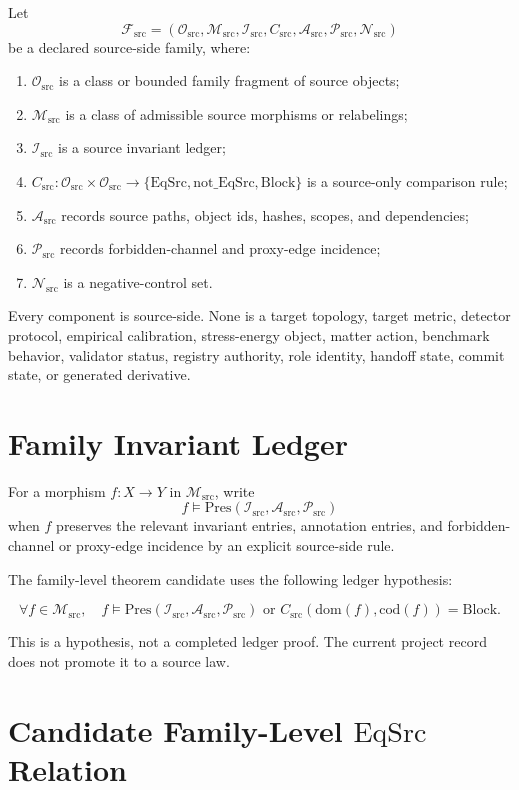 \documentclass[11pt]{article}
\newcommand{\EqSrc}{\mathrm{EqSrc}}
\newcommand{\Block}{\mathrm{Block}}
\newcommand{\NotEqSrc}{\mathrm{not\_EqSrc}}
\newcommand{\Fsrc}{\mathcal{F}_{\mathrm{src}}}
\newcommand{\Osrc}{\mathcal{O}_{\mathrm{src}}}
\newcommand{\Msrc}{\mathcal{M}_{\mathrm{src}}}
\newcommand{\Isrc}{\mathcal{I}_{\mathrm{src}}}
\newcommand{\Asrc}{\mathcal{A}_{\mathrm{src}}}
\newcommand{\Psrc}{\mathcal{P}_{\mathrm{src}}}
\newcommand{\Nsrc}{\mathcal{N}_{\mathrm{src}}}
\newcommand{\Csrc}{C_{\mathrm{src}}}
\begin{document}
Let
\[
  \Fsrc=(\Osrc,\Msrc,\Isrc,\Csrc,\Asrc,\Psrc,\Nsrc)
\]
be a declared source-side family, where:
\begin{enumerate}[label=(\alph*)]
  \item \(\Osrc\) is a class or bounded family fragment of source objects;
  \item \(\Msrc\) is a class of admissible source morphisms or relabelings;
  \item \(\Isrc\) is a source invariant ledger;
  \item \(\Csrc:\Osrc\times\Osrc\to\{\EqSrc,\NotEqSrc,\Block\}\) is a
  source-only comparison rule;
  \item \(\Asrc\) records source paths, object ids, hashes, scopes, and
  dependencies;
  \item \(\Psrc\) records forbidden-channel and proxy-edge incidence;
  \item \(\Nsrc\) is a negative-control set.
\end{enumerate}

Every component is source-side. None is a target topology, target metric,
detector protocol, empirical calibration, stress-energy object, matter action,
benchmark behavior, validator status, registry authority, role identity,
handoff state, commit state, or generated derivative.

\section{Family Invariant Ledger}

For a morphism \(f:X\to Y\) in \(\Msrc\), write
\[
  f \models \mathrm{Pres}(\Isrc,\Asrc,\Psrc)
\]
when \(f\) preserves the relevant invariant entries, annotation entries, and
forbidden-channel or proxy-edge incidence by an explicit source-side rule.

The family-level theorem candidate uses the following ledger hypothesis:

\[
  \forall f\in\Msrc,\quad
  f \models \mathrm{Pres}(\Isrc,\Asrc,\Psrc)
  \text{ or } \Csrc(\mathrm{dom}(f),\mathrm{cod}(f))=\Block.
\]

This is a hypothesis, not a completed ledger proof. The current project record
does not promote it to a source law.

\section{Candidate Family-Level \(\EqSrc\) Relation}
\end{document}

